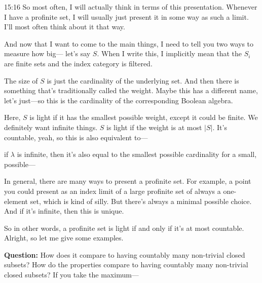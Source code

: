 \begin{unfinished}{15:16}
So most often, I will actually think in terms of this presentation. Whenever I have a profinite set, I will usually just present it in some way as such a limit. I'll most often think about it that way.

And now that I want to come to the main things, I need to tell you two ways to measure how big--- let's say $S$. When I write this, I implicitly mean that the $S_i$ are finite sets and the index category is filtered.

The size of $S$ is just the cardinality of the underlying set. 
And then there is something that's traditionally called the weight. Maybe this has a different name, let's just---so this is the cardinality of the corresponding Boolean algebra.



Here, $S$ is light if it has the smallest possible weight, except it could be finite. We definitely want infinite things. $S$ is light if the weight is at most $| S |$. It's countable, yeah, so this is also equivalent to--- 

\begin{remark}
if $\lambda$ is infinite, then it's also equal to the smallest possible cardinality for a small, possible---

In general, there are many ways to present a profinite set. For example, a point you could present as an index limit of a large profinite set of always a one-element set, which is kind of silly. But there's always a minimal possible choice. And if it's infinite, then this is unique.

\end{remark}


So in other words, a profinite set is light if and only if it's at most countable. Alright, so let me give some examples.

\textbf{Question:} How does it compare to having countably many non-trivial closed subsets? How do the properties compare to having countably many non-trivial closed subsets? If you take the maximum---


\end{unfinished}
